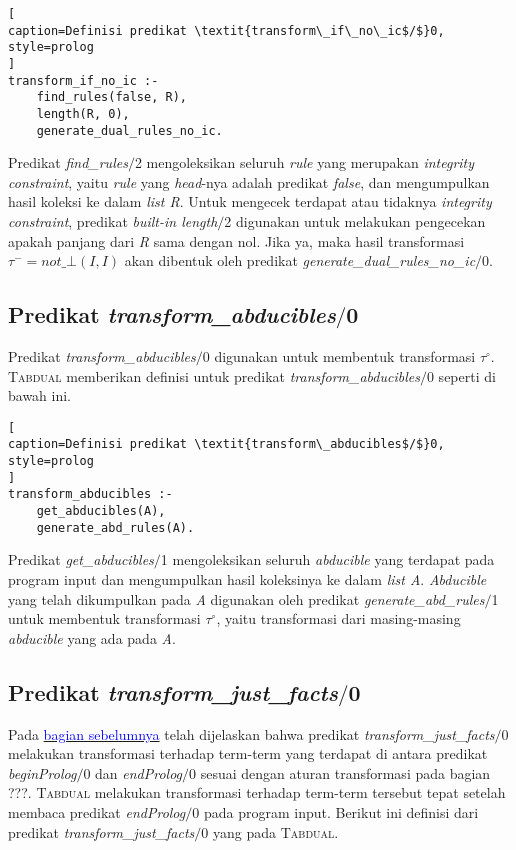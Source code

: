 \begin{lstlisting}[
caption=Definisi predikat \textit{transform\_if\_no\_ic$/$}0,
style=prolog
]
transform_if_no_ic :-
	find_rules(false, R),
	length(R, 0),
	generate_dual_rules_no_ic.
\end{lstlisting}

Predikat \textit{find\_rules$/$}2 mengoleksikan seluruh \textit{rule} yang merupakan \textit{integrity constraint}, yaitu \textit{rule} yang \textit{head}-nya adalah predikat \textit{false}, dan mengumpulkan hasil koleksi ke dalam \textit{list R}. Untuk mengecek terdapat atau tidaknya \textit{integrity constraint}, predikat \textit{built-in length$/$}2 digunakan untuk melakukan pengecekan apakah panjang dari \textit{R} sama dengan nol. Jika ya, maka hasil transformasi $\tau^- = \textit{not}\_\bot(\textit{I},\textit{I})$ akan dibentuk oleh predikat \textit{generate\_dual\_rules\_no\_ic$/$}0.

\subsection{Predikat \textit{transform\_abducibles$/$}0}

Predikat \textit{transform\_abducibles$/$}0 digunakan untuk membentuk transformasi $\tau^\circ$. \textsc{Tabdual} memberikan definisi untuk predikat \textit{transform\_abducibles$/$}0 seperti di bawah ini.
\\

\begin{lstlisting}[
caption=Definisi predikat \textit{transform\_abducibles$/$}0,
style=prolog
]
transform_abducibles :-
	get_abducibles(A),
	generate_abd_rules(A).
\end{lstlisting}

Predikat \textit{get\_abducibles$/$}1 mengoleksikan seluruh \textit{abducible} yang terdapat pada program input dan mengumpulkan hasil koleksinya ke dalam \textit{list A}. \textit{Abducible} yang telah dikumpulkan pada \textit{A} digunakan oleh predikat \textit{generate\_abd\_rules$/$}1 untuk membentuk transformasi $\tau^\circ$, yaitu transformasi dari masing-masing \textit{abducible} yang ada pada \textit{A}.

\subsection{Predikat \textit{transform\_just\_facts$/$}0}
\label{justfacts}

Pada \hyperref[justfacts2]{\textcolor{blue}{bagian sebelumnya}} telah dijelaskan bahwa predikat \textit{transform\_just\_facts$/$}0 melakukan transformasi terhadap term-term yang terdapat di antara predikat \textit{beginProlog$/$}0 dan \textit{endProlog$/$}0 sesuai dengan aturan transformasi pada bagian ???.  \textsc{Tabdual} melakukan transformasi terhadap term-term tersebut tepat setelah membaca predikat \textit{endProlog$/$}0 pada program input. Berikut ini definisi dari predikat \textit{transform\_just\_facts$/$}0 yang pada \textsc{Tabdual}.
\\

